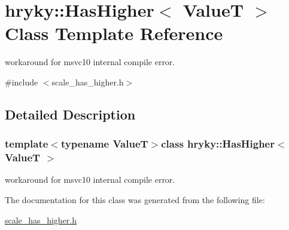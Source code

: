 \hypertarget{classhryky_1_1_has_higher}{\section{hryky\-:\-:Has\-Higher$<$ Value\-T $>$ Class Template Reference}
\label{classhryky_1_1_has_higher}
}


workaround for msvc10 internal compile error.  




{\ttfamily \#include $<$scale\-\_\-has\-\_\-higher.\-h$>$}



\subsection{Detailed Description}
\subsubsection*{template$<$typename Value\-T$>$class hryky\-::\-Has\-Higher$<$ Value\-T $>$}

workaround for msvc10 internal compile error. 

The documentation for this class was generated from the following file\-:\begin{DoxyCompactItemize}
\item 
\hyperlink{scale__has__higher_8h}{scale\-\_\-has\-\_\-higher.\-h}\end{DoxyCompactItemize}
